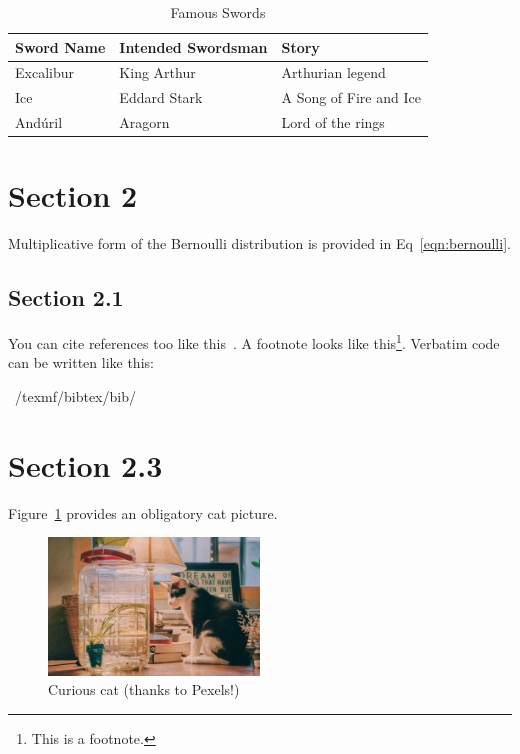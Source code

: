 \documentclass{quicknotes}
\begin{document}
\begin{table}
\caption{Famous Swords}
\label{tab:famousswords}
\centering
\begin{tabular}{lll}
\toprule
Sword Name & Intended Swordsman & Story\\
\midrule
Excalibur & King Arthur & Arthurian legend \\
Ice & Eddard Stark & A Song of Fire and Ice \\
And\'{u}ril & Aragorn & Lord of the rings \\
\bottomrule
\end{tabular}
\end{table}

\section{Section 2}
Multiplicative form of the Bernoulli distribution is provided in Eq~\ref{eqn:bernoulli}.

\subsection{Section 2.1}
You can cite references too like this~\cite{einstein1916foundation}.
A footnote looks like this\footnote{This is a footnote.}.
Verbatim code can be written like this:
\begin{code}
~/texmf/bibtex/bib/
\end{code}

\section{Section 2.3}
Figure~\ref{fig:cat} provides an obligatory cat picture.

\begin{figure}
\centering
\includegraphics[width=0.5\textwidth]{cat.jpg}
\caption{Curious cat (thanks to Pexels!)}
\label{fig:cat}
\end{figure}



\end{document}
